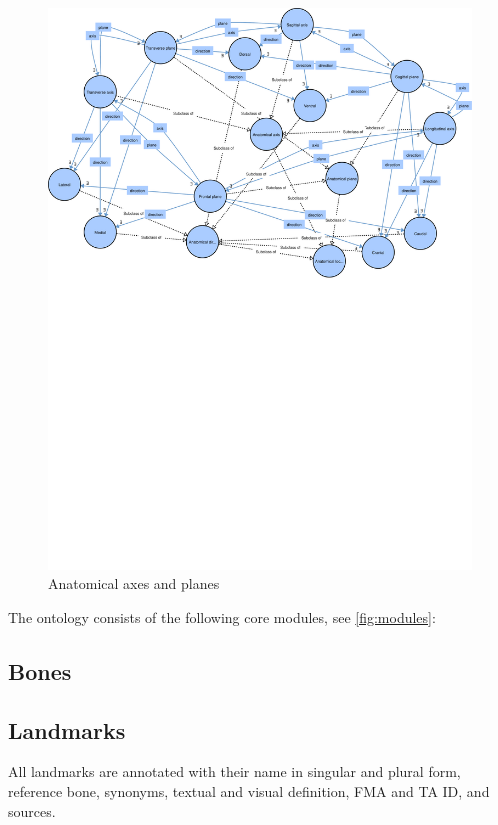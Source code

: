 \documentclass[sw]{iosart2x}
\begin{document}
\begin{figure}[h]
\includegraphics[width=\textwidth]{img/axisplane.pdf}
\caption{Anatomical axes and planes}\label{fig:axisplane}
\end{figure}

The ontology consists of the following core modules, see \cref{fig:modules}:
\subsection{Bones}\label{sec:bone}

\subsection{Landmarks}\label{sec:landmark}
All landmarks are annotated with their name in singular and plural form, reference bone, synonyms, textual and visual definition, FMA and TA ID, and sources.
\end{document}
